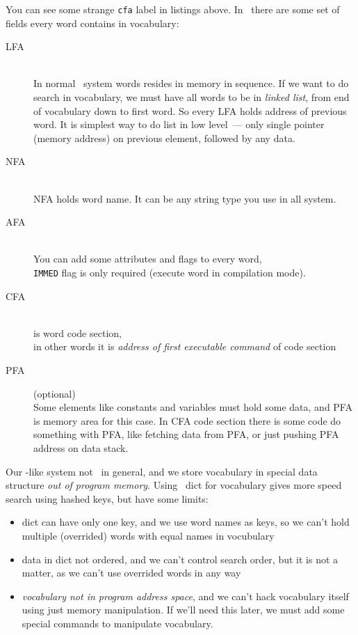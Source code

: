 You can see some strange \verb|cfa| label in listings above.
In \F\ there are some set of fields every word contains in vocabulary:
\begin{description}
	\item[LFA] \\
		In normal \F\ system words resides in memory in sequence.
		If we want to do search in vocabulary, we must have all words
		to be in \emph{linked list}, from end of vocabulary down to first word.
		So every LFA holds address of previous word.
		It is simplest way to do list in low level\ --- only single pointer
		(memory address) on previous element, followed by any data.

	\item[NFA] \\
		NFA holds word name. It can be any string type you use in all system.

	\item[AFA] \\
		You can add some attributes and flags to every word,\\
		\verb|IMMED| flag is only required (execute word in compilation mode).

	\item[CFA] \\
		is word code section,\\
		in other words it is \emph{address of first executable command}
		of code section

	\item[PFA]  (optional)\\
		Some elements like constants and variables must hold some data,
		and PFA is memory area for this case. In CFA code section there is
		some code do something with PFA, like fetching data from PFA,
		or just pushing PFA address on data stack.
		
\end{description}

\noindent
Our \F-like system not \F\ in general, and we store vocabulary in
special data structure \emph{out of program memory}. Using \py\ dict
for vocabulary gives more speed search using hashed keys, but have some limits:
\begin{itemize}[nosep]
	\item dict can have only one key, and we use word names as keys, so we
		can't hold multiple (overrided) words with equal names in vocubulary
	\item data in dict not ordered, and we can't control search order, but it
		is not a matter, as we can't use overrided words in any way
\item \emph{vocabulary not in program address space}, and we can't hack 
		vocabulary itself using just memory manipulation. If we'll need this
		later, we must add some special commands to manipulate vocabulary.
\end{itemize}

